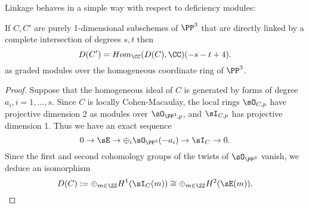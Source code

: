 Linkage behaves in a simple way with respect to deficiency modules:

\begin{theorem}\label{HR}
If $C,C'$ are purely 1-dimensional subschemes of $\PP^3$ that are directly linked by a complete intersection of degrees $s,t$ then
$$
D(C') = Hom_\CC(D(C), \CC) (-s-t+4).
$$ 
as graded modules over the homogeneous coordinate ring of $\PP^3$.
\end{theorem}

\begin{proof}
Suppose that the homogeneous ideal of $C$ is generated by forms of degree $a_i, i=1,\dots,s$. Since $C$ is locally Cohen-Macaulay,
the local rings $\sO_{C,p}$ have projective dimension 2 as modules over $\sO_{\PP^3, p}$, and $\sI_{C,p}$ has projective dimension 1.
Thus we have an exact sequence
$$
0\to \sE \to \oplus_i\sO_{\PP^3}(-a_i) \to \sI_C \to 0.
$$
Since the first and second cohomology groups of the twists of $\sO_{\PP^3}$ vanish, we deduce an isomorphism
$$
D(C) := \oplus_{m\in \ZZ} H^1(\sI_C(m)) \cong \oplus_{m\in \ZZ} H^2(\sE(m)).
$$


\end{proof}
